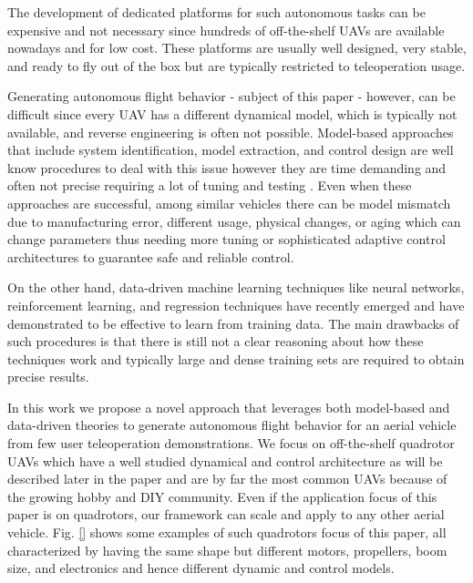 \documentclass[letterpaper, 10 pt, conference]{ieeeconf}  %
\begin{document}
The development of dedicated platforms for such autonomous tasks can be expensive and not necessary since hundreds of off-the-shelf UAVs are available nowadays and for low cost. These platforms are usually well designed, very stable, and ready to fly out of the box but are typically restricted to teleoperation usage.

Generating autonomous flight behavior - subject of this paper -  however, can be difficult since every UAV has a different dynamical model, which is typically not available, and reverse engineering is often not possible. Model-based approaches that include system identification, model extraction, and control design are well know procedures to deal with this issue however they are time demanding and often not precise requiring a lot of tuning and testing \cite{modelbased1}. Even when these approaches are successful, among similar vehicles there can be model mismatch due to manufacturing error, different usage, physical changes, or aging which can change parameters thus needing more tuning or sophisticated adaptive control architectures to guarantee safe and reliable control. 

On the other hand, data-driven machine learning techniques like neural networks, reinforcement learning, and regression techniques have recently emerged and have demonstrated to be effective to learn from training data. The main drawbacks of such procedures is that there is still not a clear reasoning about how these techniques work and typically large and dense training sets are required to obtain precise results.

In this work we propose a novel approach that leverages both model-based and data-driven theories to generate autonomous flight behavior for an aerial vehicle from few user teleoperation demonstrations. 
We focus on off-the-shelf quadrotor UAVs which have a well studied dynamical and control architecture as will be described later in the paper and are by far the most common UAVs because of the growing hobby and DIY community. Even if the application  focus of this paper is on quadrotors, our framework can scale and apply to any other aerial vehicle. Fig. \ref{} shows some examples of such quadrotors focus of this paper, all characterized by having the same shape but different motors, propellers, boom size, and electronics and hence different dynamic and control models.
\end{document}
